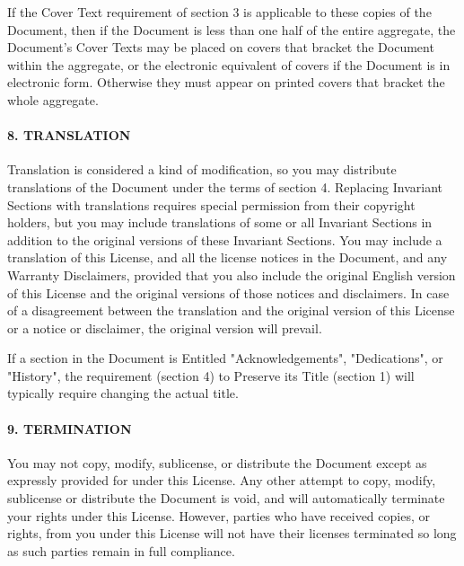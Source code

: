 \begin{multicols}{2}
{\footnotesize If the Cover Text requirement of section 3 is applicable to these copies of the Document, then if the Document is less than one half of the entire aggregate, the Document's Cover Texts may be placed on covers that bracket the Document within the aggregate, or the electronic equivalent of covers if the Document is in electronic form. Otherwise they must appear on printed covers that bracket the whole aggregate.}{\footnotesize \par}


\paragraph{{\footnotesize 8. TRANSLATION}}

{\footnotesize Translation is considered a kind of modification, so you may distribute translations of the Document under the terms of section 4. Replacing Invariant Sections with translations requires special permission from their copyright holders, but you may include translations of some or all Invariant Sections in addition to the original versions of these Invariant Sections. You may include a translation of this License, and all the license notices in the Document, and any Warranty Disclaimers, provided that you also include the original English version of this License and the original versions of those notices and disclaimers. In case of a disagreement between the translation and the original version of this License or a notice or disclaimer, the original version will prevail.}{\footnotesize \par}

{\footnotesize If a section in the Document is Entitled "Acknowledgements", "Dedications", or "History", the requirement (section 4) to Preserve its Title (section 1) will typically require changing the actual title.}{\footnotesize \par}


\paragraph{{\footnotesize 9. TERMINATION}}

{\footnotesize You may not copy, modify, sublicense, or distribute the Document except as expressly provided for under this License.  Any other attempt to copy, modify, sublicense or distribute the Document is void, and will automatically terminate your rights under this License.  However, parties who have received copies, or rights, from you under this License will not have their licenses terminated so long as such parties remain in full compliance.}{\footnotesize \par}



\end{multicols}
